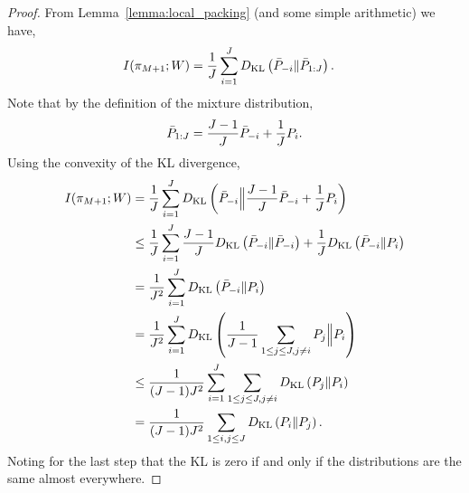 \begin{proof}
From Lemma~\ref{lemma:local_packing} (and some simple arithmetic) we have,
\begin{align*}
I(\pi_{M+1}; W) &= \frac{1}{J} \sum_{i=1}^{J} D_{\mathrm{KL}}\left(\bar{P}_{-i}\Vert\bar{P}_{1:J}\right).
\end{align*}
Note that by the definition of the mixture distribution,
\[
\bar{P}_{1:J} = \frac{J-1}{J} \bar{P}_{-i} + \frac{1}{J} P_i.
\]
Using the convexity of the KL divergence,
\begin{align*}
I(\pi_{M+1}; W) &= \frac{1}{J} \sum_{i=1}^{J} D_{\mathrm{KL}}\left(\bar{P}_{-i}\Big\Vert\frac{J-1}{J} \bar{P}_{-i}
+ \frac{1}{J} P_i\right)\\ 
&\le \frac{1}{J} \sum_{i=1}^{J} \frac{J-1}{J} D_{\mathrm{KL}}\left(\bar{P}_{-i}\Vert\bar{P}_{-i}\right) + \frac{1}{J} D_{\mathrm{KL}}\left(\bar{P}_{-i}\Vert P_i\right)\\
&=\frac{1}{J^2} \sum_{i=1}^{J} D_{\mathrm{KL}}\left(\bar{P}_{-i}\Vert P_i\right)\\
&= \frac{1}{J^2} \sum_{i=1}^{J} D_{\mathrm{KL}}\left(\frac{1}{J-1}\sum_{1 \le j \le J, j \neq i} P_j \Big\Vert P_i \right)\\
&\le \frac{1}{(J-1)J^2} \sum_{i=1}^{J} \sum_{1 \le j \le J, j \neq i} D_{\mathrm{KL}}\left(P_j\Vert P_i\right)\\
&= \frac{1}{(J-1)J^2} \sum_{1 \le i,j \le J} D_{\mathrm{KL}}\left(P_i\Vert P_j\right).
\end{align*}
Noting for the last step that the KL is zero if and only if the distributions are the same almost everywhere.
\end{proof}